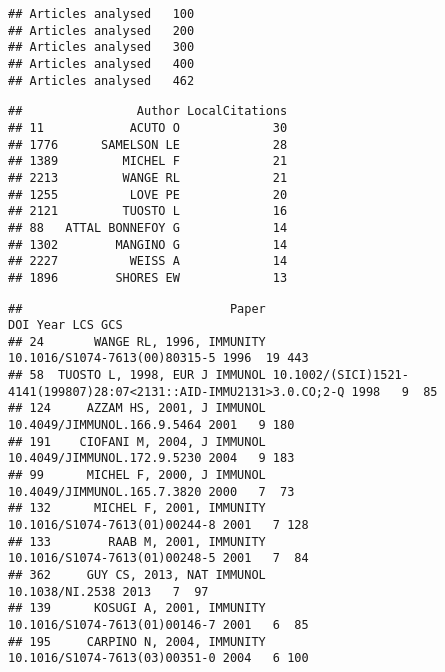\documentclass[]{article}
\newenvironment{Shaded}{\begin{snugshade}}{\end{snugshade}}
\newcommand{\DecValTok}[1]{\textcolor[rgb]{0.00,0.00,0.81}{#1}}
\newcommand{\NormalTok}[1]{#1}
\newcommand{\OperatorTok}[1]{\textcolor[rgb]{0.81,0.36,0.00}{\textbf{#1}}}
\begin{document}
\begin{verbatim}
## Articles analysed   100 
## Articles analysed   200 
## Articles analysed   300 
## Articles analysed   400 
## Articles analysed   462
\end{verbatim}

\begin{Shaded}
\end{Shaded}

\begin{verbatim}
##                Author LocalCitations
## 11            ACUTO O             30
## 1776      SAMELSON LE             28
## 1389         MICHEL F             21
## 2213         WANGE RL             21
## 1255          LOVE PE             20
## 2121         TUOSTO L             16
## 88   ATTAL BONNEFOY G             14
## 1302        MANGINO G             14
## 2227          WEISS A             14
## 1896        SHORES EW             13
\end{verbatim}

\begin{Shaded}
\end{Shaded}

\begin{verbatim}
##                             Paper                                                                DOI Year LCS GCS
## 24       WANGE RL, 1996, IMMUNITY                                      10.1016/S1074-7613(00)80315-5 1996  19 443
## 58  TUOSTO L, 1998, EUR J IMMUNOL 10.1002/(SICI)1521-4141(199807)28:07<2131::AID-IMMU2131>3.0.CO;2-Q 1998   9  85
## 124     AZZAM HS, 2001, J IMMUNOL                                        10.4049/JIMMUNOL.166.9.5464 2001   9 180
## 191    CIOFANI M, 2004, J IMMUNOL                                        10.4049/JIMMUNOL.172.9.5230 2004   9 183
## 99      MICHEL F, 2000, J IMMUNOL                                        10.4049/JIMMUNOL.165.7.3820 2000   7  73
## 132      MICHEL F, 2001, IMMUNITY                                      10.1016/S1074-7613(01)00244-8 2001   7 128
## 133        RAAB M, 2001, IMMUNITY                                      10.1016/S1074-7613(01)00248-5 2001   7  84
## 362     GUY CS, 2013, NAT IMMUNOL                                                    10.1038/NI.2538 2013   7  97
## 139      KOSUGI A, 2001, IMMUNITY                                      10.1016/S1074-7613(01)00146-7 2001   6  85
## 195     CARPINO N, 2004, IMMUNITY                                      10.1016/S1074-7613(03)00351-0 2004   6 100
\end{verbatim}
\end{document}
